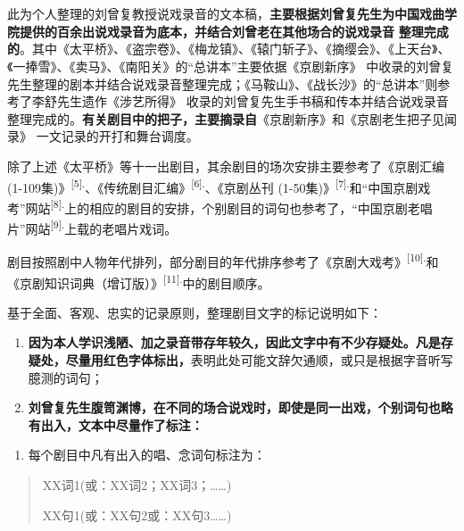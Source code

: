 	\section{}\label{ux8bf4-ux660e}%

	此为个人整理的刘曾复教授说戏录音的文本稿，\textbf{主要根据刘曾复先生为中国戏曲学院提供的百余出说戏录音为底本，并结合刘曾老在其他场合的说戏录音}%
\textbf{整理完成的}。其中《太平桥》、《盗宗卷》、《梅龙镇》、《辕门斩子》、《摘缨会》、《上天台》、《一捧雪》、《卖马》、《南阳关》的``总讲本''主要依据《京剧新序》%
中收录的刘曾复先生整理的剧本并结合说戏录音整理完成；《马鞍山》、《战长沙》的``总讲本''则参考了李舒先生遗作《涉艺所得》%
收录的刘曾复先生手书稿和传本并结合说戏录音整理完成的。\textbf{有关剧目中的把子，主要摘录自}《京剧新序》和《京剧老生把子见闻录》%
一文记录的开打和舞台调度。

除了上述《太平桥》等十一出剧目，其余剧目的场次安排主要参考了《京剧汇编
(1-109集)》\textsuperscript{{[}5{]}.}、《传统剧目汇编》\textsuperscript{{[}6{]}.}、《京剧丛刊
(1-50集)》\textsuperscript{{[}7{]}.}和``中国京剧戏考''网站\textsuperscript{{[}8{]}.}上的相应的剧目的安排，个别剧目的词句也参考了，``中国京剧老唱片''网站\textsuperscript{{[}9{]}.}上载的老唱片戏词。

剧目按照剧中人物年代排列，部分剧目的年代排序参考了《京剧大戏考》\textsuperscript{{[}10{]}.}和《京剧知识词典（增订版）》\textsuperscript{{[}11{]}.}中的剧目顺序。

基于全面、客观、忠实的记录原则，整理剧目文字的标记说明如下：

\begin{enumerate}
\def\labelenumi{\arabic{enumi}.}
\item
  \textbf{因为本人学识浅陋、加之录音带存年较久，因此文字中有不少存疑处。凡是存疑处，尽量用红色字体标出，}表明此处可能文辞欠通顺，或只是根据字音听写臆测的词句；
\item
  \textbf{刘曾复先生腹笥渊博，在不同的场合说戏时，即使是同一出戏，个别词句也略有出入，文本中尽量作了标注：}
\end{enumerate}

\begin{enumerate}
\def\labelenumi{\arabic{enumi}.}
\item
  每个剧目中凡有出入的唱、念词句标注为：
\end{enumerate}

\begin{quote}
{XX词1}(或：XX词2；XX词3；\ldots{}\ldots{})

{XX句1}(或：XX句2或：XX句3\ldots{}\ldots{})
\end{quote}


